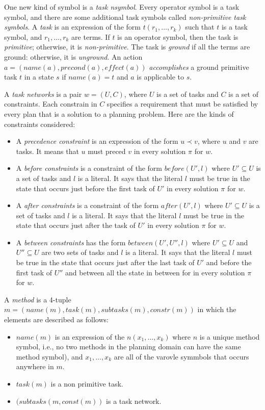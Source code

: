 One new kind of symbol is a {\em task nsymbol}. Every operator symbol is a task symbol, and there are some additional task symbols called {\em non-primitive task symbols}. A {\em task} is an expression of the form $t(r_1,\ldots, r_k)$ such that $t$ is a task symbol, and $r_1, \ldots, r_k$ are terms. If $t$ is an operator symbol, then the task is {\em primitive}; otherwise, it is {\em non-primitive}. The task is {\em ground} if all the terms are ground: otherwise, it is {\em unground}. An action $a = (name(a), precond(a), effect(a))$ {\em accomplishes} a ground primitive task $t$ in a state $s$ if $name(a) = t$ and $a$ is applicable to $s$. 

A {\em task networks} is a pair $w = (U, C)$, where $U$ is a set of tasks and $C$ is a set of constraints. Each constrain in $C$ specifies a requirement that must be satisfied by every plan that is a solution to a planning problem. Here are the kinds of constraints considered:
\begin{itemize}
\item A {\em precedence constraint} is an expression of the form $u \prec v$, where $u$ and $v$ are tasks. It means that $u$ must preced $v$ in every solution $\pi$ for $w$. %
\item A {\em before constraints} is a constraint of the form $before(U', l)$ where $U' \subseteq U$ is a set of tasks and $l$ is a literal. It says that the literal $l$ must be true in the state that occurs just before the first task of $U'$ in every solution $\pi$ for $w$. %
\item A {\em after constraints} is a constraint of the form $after(U', l)$ where $U' \subseteq U$ is a set of tasks and $l$ is a literal. It says that the literal $l$ must be true in the state that occurs just after the task of $U'$ in every solution $\pi$ for $w$. 
\item A {\em between constraints} has the form $between(U',U'', l)$ where $U' \subseteq U$ and $U'' \subseteq U$ are two sets of tasks and $l$ is a literal. It says that the literal $l$ must be true in the state that occurs just after the last task of $U'$ and before the first task of $U''$ and between all the state in between for in every solution $\pi$ for $w$. 
\end{itemize}

A {\em method} is a 4-tuple $m = (name(m), task(m), subtasks(m), constr(m))$ in which the elements are described as follows:
\begin{itemize}
\item $name(m)$ is an expression of the $n(x_1, \ldots, x_k)$ where $n$ is a unique method symbol, i.e., no two methods in the planning domain can have the same method symbol), and $x_1, \ldots, x_k$ are all of the varovle symmbols that occurs anywhere in $m$.
\item $task(m)$ is a non primitive task.
\item $(subtasks(m, const(m))$ is a task network.  
\end{itemize}

